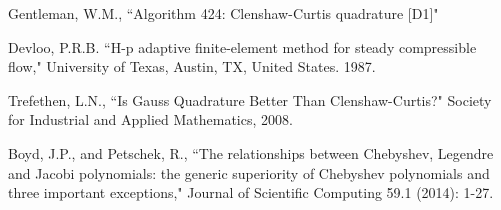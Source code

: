 \documentclass[10pt,a4paper]{article}
\begin{document}
\begin{thebibliography}{1}
		Gentleman, W.M., ``Algorithm 424: Clenshaw-Curtis quadrature [D1]"
		
		Devloo, P.R.B. ``H-p adaptive finite-element method for steady compressible flow," University of Texas, Austin, TX, United States. 1987.
		
		Trefethen, L.N., ``Is Gauss Quadrature Better Than Clenshaw-Curtis?" Society for Industrial and Applied Mathematics, 2008.
		
		Boyd, J.P., and Petschek, R., ``The relationships between Chebyshev, Legendre and Jacobi polynomials: the generic superiority of Chebyshev polynomials and three important exceptions," Journal of Scientific Computing 59.1 (2014): 1-27.
		
	\end{thebibliography}
\end{document}
